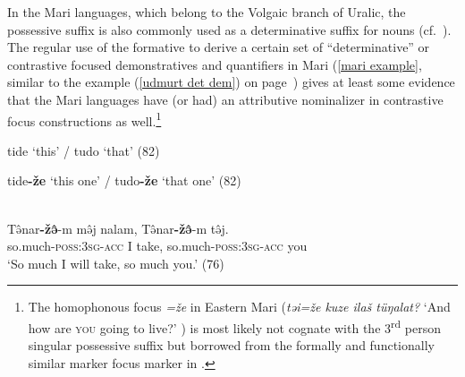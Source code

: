 In the Mari languages, which belong to the Volgaic branch of Uralic, the possessive suffix is also commonly used as a determinative suffix for nouns (cf.~\citealt[75–76]{alhoniemi1993}). The regular use of the formative to derive a certain set of “determinative” or contrastive focused demonstratives and quantifiers in Mari (\ref{mari example}, similar to the  example (\ref{udmurt det dem}) on page~\pageref{udmurt det dem}) gives at least some evidence that the Mari languages have (or had) an attributive nominalizer in contrastive focus constructions as well.\footnote{The homophonous focus  \textit{=že} in Eastern Mari (\textit{təi=že kuze ilaš tüŋalat?} ‘And how are \textsc{you} going to live?’ \citealt[80]{alhoniemi1993}) is most likely not cognate with the 3\textsuperscript{rd} person singular possessive suffix but borrowed from the formally and functionally similar marker focus marker in .}%
\begin{exe}
\ex {}
\label{mari example}
\begin{xlist}
\begin{xlist}
\ex tide {\upshape ‘this’ /} tudo {\upshape ‘that’ (82)}
\end{xlist}
\begin{xlist}
\ex tide\textbf{-že} {\upshape ‘this one’ /} tudo\textbf{-že} {\upshape ‘that one’ (82)}%
\end{xlist}
\\
\gll	Tə̂nar\textbf{-žə̂}-m mə̂j nalam, Tə̂nar\textbf{-žə̂}-m tə̂j.\\
	so.much-\textsc{poss:3sg}-\textsc{acc} I take, so.much-\textsc{poss:3sg}-\textsc{acc} you\\
\glt	‘So much I will take, so much you.’ (76)
\end{xlist}
\end{exe}

